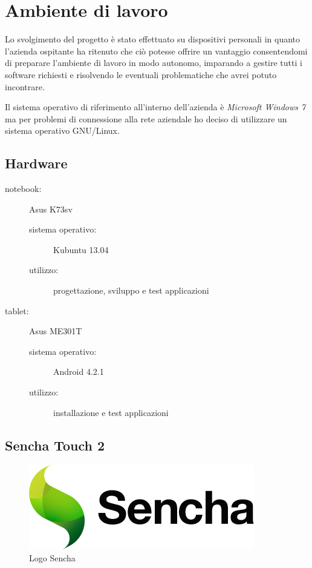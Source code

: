 \chapter{Ambiente di lavoro}\label{ch:ambiente}
Lo svolgimento del progetto è stato effettuato su dispositivi personali in quanto l'azienda ospitante ha ritenuto che ciò potesse offrire un vantaggio consentendomi di preparare l'ambiente di lavoro in modo autonomo, imparando a gestire tutti i software richiesti e risolvendo le eventuali problematiche che avrei potuto incontrare.

Il sistema operativo di riferimento all'interno dell'azienda è \emph{Microsoft Windows 7} ma per problemi di connessione alla rete aziendale ho deciso di utilizzare un sistema operativo GNU/Linux.

\section{Hardware}
\begin{description}
\item[notebook:] Asus K73sv
	\begin{description}
	\item[sistema operativo:] Kubuntu 13.04
	\item[utilizzo:] progettazione, sviluppo e test applicazioni
	\end{description}
\item[tablet:] Asus ME301T
	\begin{description}
	\item[sistema operativo:] Android 4.2.1
	\item[utilizzo:] installazione e test applicazioni
	\end{description}
\end{description}

\section{Sencha Touch 2}
\begin{figure}[htb]
\centering
\includegraphics[scale=0.4]{gfx/sencha-large}
\caption{Logo Sencha}
\label{fig:sencha}
\end{figure}

